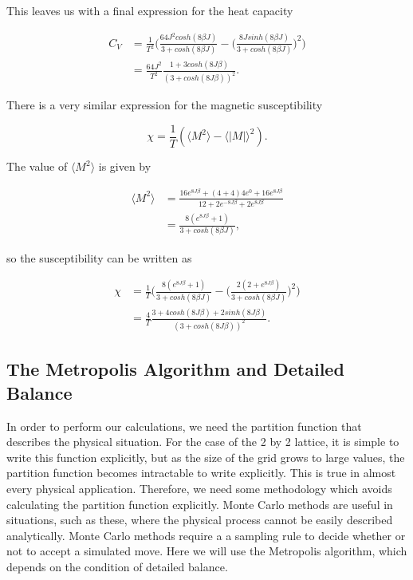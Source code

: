 \documentclass[%
oneside,                 %
final,                   %
10pt]{article}
\begin{document}
This leaves us with a final expression for the heat capacity

\begin{equation*}
\begin{split}
C_V & =\frac{1}{T^2} \Big( \frac{64 J^2 cosh(8 \beta J)}{3 + cosh(8 \beta J)}-  \Big(\frac{8 J sinh(8 \beta J)}{3 + cosh(8 \beta J)}\Big)^2 \Big) \\
&=\frac{64 J^2}{T^2}  \frac{1+3 cosh(8J \beta)}{(3 + cosh(8J \beta))^2}.
\end{split}
\end{equation*}

There is a very similar expression for the magnetic susceptibility 

\begin{equation*}
\chi=\frac{1}{T} (\langle M^2 \rangle - \langle |M| \rangle ^2).
\end{equation*}

The value of $\langle M^2 \rangle$ is given by

\begin{equation*}
\begin{split}
\langle M^2 \rangle & = \frac{16 e^{8 J \beta}+(4+4)4e^0 +16 e^{8 J \beta}}{12+2e^{-8 J \beta} + 2e^{8 J \beta}} \\
& = \frac{8(e^{8J\beta}+1)}{3 + cosh(8 \beta J)},
\end{split}
\end{equation*}

so the susceptibility can be written as 

\begin{equation*}
\begin{split}
\chi & =\frac{1}{T} \Big( \frac{8(e^{8J\beta}+1)}{3 + cosh(8 \beta J)} -  \Big(\frac{2(2+e^{8 J \beta})}{3 + cosh(8 \beta J)}\Big)^2 \Big) \\
&=\frac{4}{T}  \frac{3+4 cosh(8J \beta) + 2 sinh(8 J \beta)}{(3 + cosh(8J \beta))^2}.
\end{split}
\end{equation*}

\subsection{The Metropolis Algorithm and Detailed Balance}

In order to perform our calculations, we need the partition function that describes the physical situation.  For the case of the 2 by 2 lattice, it is simple to write this function explicitly, but as the size of the grid grows to large values, the partition function becomes intractable to write explicitly.  This is true in almost every physical application. Therefore, we need some methodology which avoids calculating the partition function explicitly. Monte Carlo methods are useful in situations, such as these, where the physical process cannot be easily described analytically.  Monte Carlo methods require a a sampling rule to decide whether or not to accept a simulated move.  Here we will use the Metropolis algorithm, which depends on the condition of detailed balance. 
\end{document}
